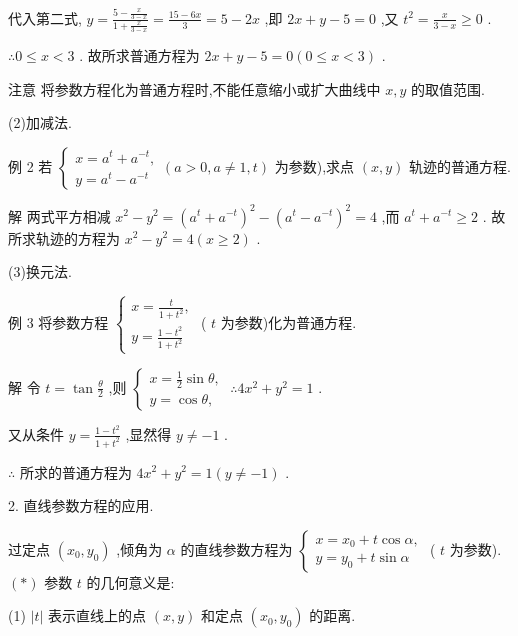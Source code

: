 \documentclass[10pt]{article}
\begin{document}
代入第二式, \(y = \frac{5 - \frac{x}{3 - x}}{1 + \frac{x}{3 - x}} = \frac{{15} - {6x}}{3} = 5 - {2x}\) ,即 \({2x} + y - 5 = 0\) ,又 \({t}^{2} = \frac{x}{3 - x} \geq  0\) .

\(\therefore 0 \leq  x < 3\) . 故所求普通方程为 \({2x} + y - 5 = 0\left( {0 \leq  x < 3}\right)\) .

注意 将参数方程化为普通方程时,不能任意缩小或扩大曲线中 \(x,y\) 的取值范围.

(2)加减法.

例 2 若 \(\left\{  {\begin{array}{l} x = {a}^{t} + {a}^{-t}, \\  y = {a}^{t} - {a}^{-t} \end{array}\left( {a > 0,a \neq  1,t}\right) }\right.\) 为参数),求点 \(\left( {x,y}\right)\) 轨迹的普通方程.

解 两式平方相减 \({x}^{2} - {y}^{2} = {\left( {a}^{t} + {a}^{-t}\right) }^{2} - {\left( {a}^{t} - {a}^{-t}\right) }^{2} = 4\) ,而 \({a}^{t} + {a}^{-t} \geq  2\) . 故所求轨迹的方程为 \({x}^{2} - {y}^{2} = 4\left( {x \geq  2}\right)\) .

(3)换元法.

例 3 将参数方程 \(\left\{  \begin{array}{l} x = \frac{t}{1 + {t}^{2}}, \\  y = \frac{1 - {t}^{2}}{1 + {t}^{2}} \end{array}\right.\) ( \(t\) 为参数)化为普通方程.

解 令 \(t = \tan \frac{\theta }{2}\) ,则 \(\left\{  {\begin{array}{l} x = \frac{1}{2}\sin \theta , \\  y = \cos \theta , \end{array}\;\therefore 4{x}^{2} + {y}^{2} = 1}\right.\) .

又从条件 \(y = \frac{1 - {t}^{2}}{1 + {t}^{2}}\) ,显然得 \(y \neq   - 1\) .

\(\therefore\) 所求的普通方程为 \(4{x}^{2} + {y}^{2} = 1\left( {y \neq   - 1}\right)\) .

2. 直线参数方程的应用.

过定点 \(\left( {{x}_{0},{y}_{0}}\right)\) ,倾角为 \(\alpha\) 的直线参数方程为 \(\left\{  \begin{array}{l} x = {x}_{0} + t\cos \alpha , \\  y = {y}_{0} + t\sin \alpha  \end{array}\right.\) ( \(t\) 为参数). \(\left( *\right)\) 参数 \(t\) 的几何意义是:

(1) \(\left| t\right|\) 表示直线上的点 \(\left( {x,y}\right)\) 和定点 \(\left( {{x}_{0},{y}_{0}}\right)\) 的距离.
\end{document}
